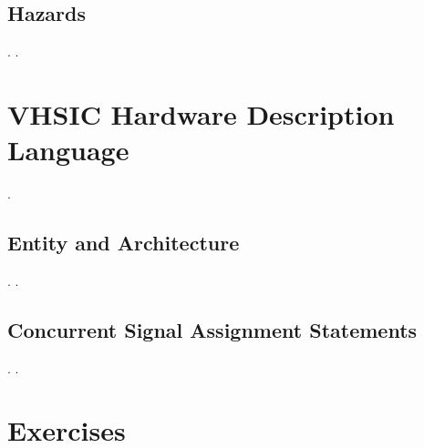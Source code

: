 \subsection{Hazards}
\pagebreak
.
\pagebreak
.

\section{VHSIC Hardware Description Language}
\pagebreak
.
\subsection{Entity and Architecture}
\pagebreak
.
\pagebreak
.
\subsection{Concurrent Signal Assignment Statements}
\pagebreak
.
\pagebreak
.

\section{Exercises}

